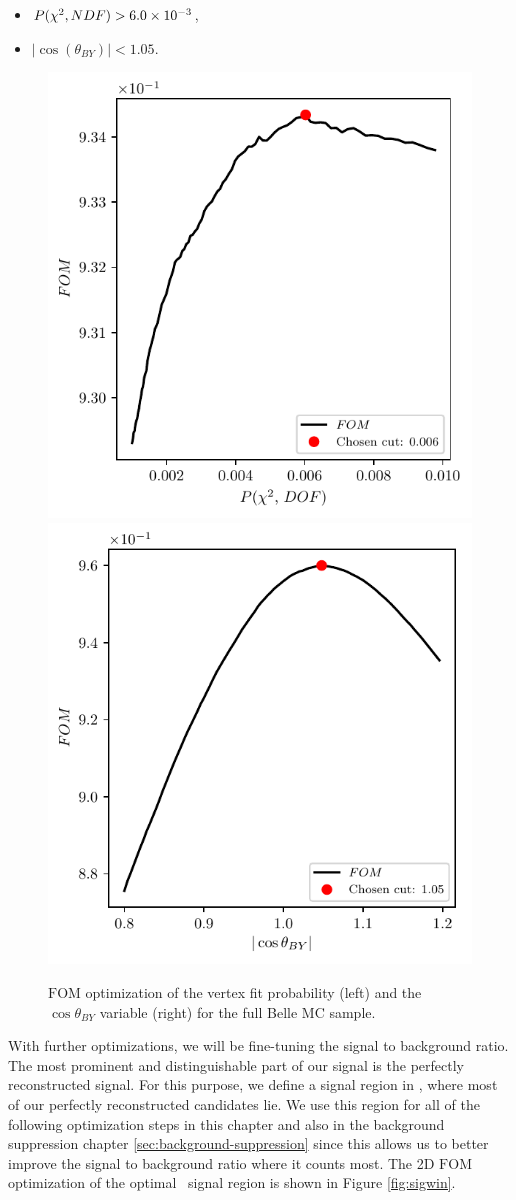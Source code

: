 \begin{itemize}
	\item $P(\chi^2,NDF) > 6.0\times 10^{-3}$,
	\item $\vert \cos \left(\theta_{BY}\right) \vert < 1.05$.
\end{itemize}

\begin{figure}[!htb]
	\centering
	\captionsetup{width=0.8\linewidth}
	\includegraphics[width=0.48\linewidth]{fig/VTX_precise}
	\includegraphics[width=0.48\linewidth]{fig/cosBY_precise}
	\caption{$\mathrm{FOM}$ optimization of the vertex fit probability (left) and the $\cos \theta_{BY}$ variable (right) for the full Belle MC sample.}
	\label{fig:preciseFOM}
\end{figure}

With further optimizations, we will be fine-tuning the signal to background ratio. The most prominent and distinguishable part of our signal is the perfectly reconstructed signal. For this purpose, we define a signal region in \vars, where most of our perfectly reconstructed candidates lie. We use this region for all of the following optimization steps in this chapter and also in the background suppression chapter \ref{sec:background-suppression} since this allows us to better improve the signal to background ratio where it counts most. The 2D $\mathrm{FOM}$ optimization of the optimal \vars~signal region is shown in Figure \ref{fig:sigwin}.


